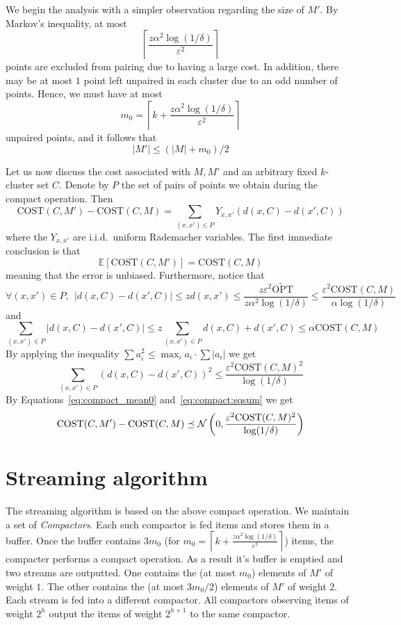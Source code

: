 \documentclass[11pt]{article}
\newcommand{\ceil}[1]{\left \lceil #1 \right \rceil}
\newcommand{\E}{{\mathbb{E}}}
\newcommand{\eps}{\varepsilon}
\newcommand{\cost}{\text{COST}}
\newcommand{\topt}{\widetilde{\text{OPT}}}
\newcommand{\N}{{\cal N}}
\begin{document}
We begin the analysis with a simpler observation regarding the size of $M'$. By Markov's inequality, at most 
$$\ceil{\frac{ z \alpha^2 \log(1/\delta)}{\eps^2}}$$
points are excluded from pairing due to having a large cost. In addition, there may be at most $1$ point left unpaired in each cluster due to an odd number of points. Hence, we must have at most 
$$m_0 = \ceil{k+\frac{ z \alpha^2 \log(1/\delta)}{\eps^2}}$$
unpaired points, and it follows that 
$$ |M'| \leq (|M|+m_0)/2 $$

Let us now discuss the cost associated with $M,M'$ and an arbitrary fixed $k$-cluster set $C$. Denote by $P$ the set of pairs of points we obtain during the compact operation. Then
$$ \cost(C,M') - \cost(C,M) = \sum_{(x,x') \in P} Y_{x,x'} \left( d(x,C) - d(x',C) \right) $$
where the $Y_{x,x'}$ are i.i.d.\ uniform Rademacher variables. The first immediate conclusion is that
\begin{equation} \label{eq:compact_mean0}
\E[\cost(C,M')] = \cost(C,M)
\end{equation}
meaning that the error is unbiased. Furthermore, notice that 
$$\forall (x,x') \in P, \ \ |d(x,C)-d(x',C)| \leq z d(x,x') \leq \frac{z \eps^2 \topt}{z \alpha^2 \log(1/\delta)} \leq \frac{\eps^2 \cost(C,M)}{ \alpha \log(1/\delta)}$$
and
$$\sum_{(x,x') \in P}|d(x,C)-d(x',C)| \leq z \sum_{(x,x') \in P} d(x,C) + d(x',C) \leq \alpha \cost(C,M)$$
By applying the inequality $\sum a_i^2 \leq \max_i a_i \cdot \sum |a_i|$ we get
\begin{equation} \label{eq:compact:sqsum}
\sum_{(x,x') \in P}\left( d(x,C)-d(x',C) \right)^2 \leq \frac{\eps^2 \cost(C,M)^2}{  \log(1/\delta)}
\end{equation}
By Equations~\eqref{eq:compact_mean0} and~\eqref{eq:compact:sqsum} we get
\begin{equation} \label{eq:compact_subg}
\cost(C,M') - \cost(C,M) \preceq \N \left(0,\frac{\eps^2 \cost(C,M)^2}{  \log(1/\delta)} \right)
\end{equation}

\section{Streaming algorithm}
The streaming algorithm is based on the above compact operation. We maintain a set of \emph{Compactors}. Each such compactor is fed items and stores them in a buffer. Once the buffer contains $3m_0$ (for $m_0 = \ceil{k+\frac{ z \alpha^2 \log(1/\delta)}{\eps^2}}$) items, the compacter performs a compact operation. As a result it's buffer is emptied and two streams are outputted. One contains the (at most $m_0$) elements of $M'$ of weight $1$. The other contains the (at most $3m_0/2$) elements of $M'$ of weight $2$. Each stream is fed into a different compactor. All compactors observing items of weight $2^h$ output the items of weight $2^{h+1}$ to the same compactor.
\end{document}
